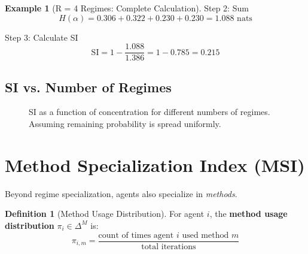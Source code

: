 \documentclass[11pt,a4paper]{article}
\theoremstyle{definition}
\newtheorem{definition}{Definition}[section]
\newtheorem{example}{Example}[section]
\theoremstyle{plain}
\newcommand{\SI}{\text{SI}}
\begin{document}
\begin{example}[R = 4 Regimes: Complete Calculation]
Step 2: Sum
\begin{equation}
H(\alpha) = 0.306 + 0.322 + 0.230 + 0.230 = 1.088 \text{ nats}
\end{equation}

Step 3: Calculate SI
\begin{equation}
\SI = 1 - \frac{1.088}{1.386} = 1 - 0.785 = 0.215
\end{equation}
\end{example}

\subsection{SI vs. Number of Regimes}

\begin{figure}[h]
\centering
{}
\caption{SI as a function of concentration for different numbers of regimes. Assuming remaining probability is spread uniformly.}
\end{figure}

\section{Method Specialization Index (MSI)}

Beyond regime specialization, agents also specialize in \textit{methods}.

\begin{definition}[Method Usage Distribution]
For agent $i$, the \textbf{method usage distribution} $\pi_i \in \Delta^M$ is:
\begin{equation}
\pi_{i,m} = \frac{\text{count of times agent } i \text{ used method } m}{\text{total iterations}}
\end{equation}
\end{definition}
\end{document}
